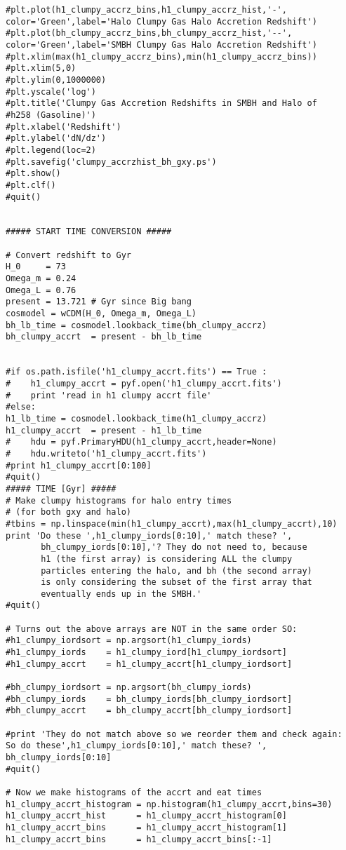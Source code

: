 \documentclass[12pt,headA,chapB]{fiskthesis}
\begin{document}
\begin{verbatim}
#plt.plot(h1_clumpy_accrz_bins,h1_clumpy_accrz_hist,'-',
color='Green',label='Halo Clumpy Gas Halo Accretion Redshift')
#plt.plot(bh_clumpy_accrz_bins,bh_clumpy_accrz_hist,'--',
color='Green',label='SMBH Clumpy Gas Halo Accretion Redshift')
#plt.xlim(max(h1_clumpy_accrz_bins),min(h1_clumpy_accrz_bins))
#plt.xlim(5,0)
#plt.ylim(0,1000000)
#plt.yscale('log')
#plt.title('Clumpy Gas Accretion Redshifts in SMBH and Halo of 
#h258 (Gasoline)')
#plt.xlabel('Redshift')
#plt.ylabel('dN/dz')
#plt.legend(loc=2)
#plt.savefig('clumpy_accrzhist_bh_gxy.ps')
#plt.show()
#plt.clf()
#quit()


##### START TIME CONVERSION #####

# Convert redshift to Gyr
H_0     = 73 
Omega_m = 0.24
Omega_L = 0.76
present = 13.721 # Gyr since Big bang
cosmodel = wCDM(H_0, Omega_m, Omega_L)
bh_lb_time = cosmodel.lookback_time(bh_clumpy_accrz)
bh_clumpy_accrt  = present - bh_lb_time


#if os.path.isfile('h1_clumpy_accrt.fits') == True :
#    h1_clumpy_accrt = pyf.open('h1_clumpy_accrt.fits')
#    print 'read in h1 clumpy accrt file'
#else:
h1_lb_time = cosmodel.lookback_time(h1_clumpy_accrz) 
h1_clumpy_accrt  = present - h1_lb_time
#    hdu = pyf.PrimaryHDU(h1_clumpy_accrt,header=None)
#    hdu.writeto('h1_clumpy_accrt.fits')
#print h1_clumpy_accrt[0:100]
#quit()
##### TIME [Gyr] #####
# Make clumpy histograms for halo entry times 
# (for both gxy and halo) 
#tbins = np.linspace(min(h1_clumpy_accrt),max(h1_clumpy_accrt),10)
print 'Do these ',h1_clumpy_iords[0:10],' match these? ',
       bh_clumpy_iords[0:10],'? They do not need to, because 
       h1 (the first array) is considering ALL the clumpy 
       particles entering the halo, and bh (the second array) 
       is only considering the subset of the first array that 
       eventually ends up in the SMBH.'
#quit()

# Turns out the above arrays are NOT in the same order SO:
#h1_clumpy_iordsort = np.argsort(h1_clumpy_iords)
#h1_clumpy_iords    = h1_clumpy_iord[h1_clumpy_iordsort]
#h1_clumpy_accrt    = h1_clumpy_accrt[h1_clumpy_iordsort]

#bh_clumpy_iordsort = np.argsort(bh_clumpy_iords)
#bh_clumpy_iords    = bh_clumpy_iords[bh_clumpy_iordsort]
#bh_clumpy_accrt    = bh_clumpy_accrt[bh_clumpy_iordsort]

#print 'They do not match above so we reorder them and check again: 
So do these',h1_clumpy_iords[0:10],' match these? ',
bh_clumpy_iords[0:10]
#quit()

# Now we make histograms of the accrt and eat times
h1_clumpy_accrt_histogram = np.histogram(h1_clumpy_accrt,bins=30)
h1_clumpy_accrt_hist      = h1_clumpy_accrt_histogram[0]
h1_clumpy_accrt_bins      = h1_clumpy_accrt_histogram[1]
h1_clumpy_accrt_bins      = h1_clumpy_accrt_bins[:-1]


\end{verbatim}
\end{document}
